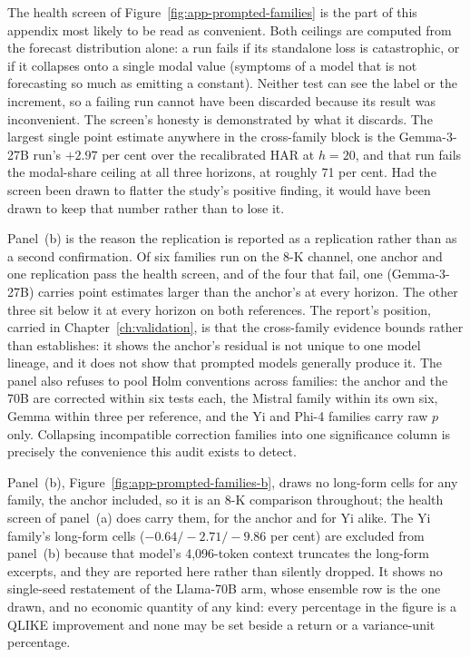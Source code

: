 The health screen of Figure~\ref{fig:app-prompted-families} is the part of this appendix most likely to be read as convenient. Both ceilings are computed from the
forecast distribution alone: a run fails if its standalone loss is
catastrophic, or if it collapses onto a single modal value (symptoms of a
model that is not forecasting so much as emitting a constant). Neither
test can see the label or the increment, so a failing run cannot have been
discarded because its result was inconvenient. The screen's honesty is
demonstrated by what it discards. The largest single point estimate anywhere
in the cross-family block is the Gemma-3-27B run's $+2.97$ per cent over the
recalibrated HAR at $h=20$, and that run fails the modal-share ceiling at all
three horizons, at roughly 71 per cent. %
Had the screen been drawn to flatter the study's positive finding, it would
have been drawn to keep that number rather than to lose it.

Panel~(b) is the reason the replication is reported as a replication rather
than as a second confirmation. Of six families run on the 8-K channel, one
anchor and one replication pass the health screen, and of the four that fail,
one (Gemma-3-27B) carries point estimates larger than the anchor's at
every horizon. The other three sit below it at every horizon on both
references. %
The report's position,
carried in Chapter~\ref{ch:validation}, is that the cross-family evidence
bounds rather than establishes: it shows the anchor's residual is not unique
to one model lineage, and it does not show that prompted models generally
produce it. The panel also refuses to pool Holm conventions across families:
the anchor and the 70B are corrected within six tests each, the Mistral
family within its own six, Gemma within three per reference, and the Yi and
Phi-4 families carry raw $p$ only. Collapsing incompatible
correction families into one significance column is precisely the convenience
this audit exists to detect.

Panel~(b), Figure~\ref{fig:app-prompted-families-b}, draws no long-form cells
for any family, the anchor included, so it is an 8-K comparison throughout;
the health screen of panel~(a) does carry them, for the anchor and for Yi alike. The Yi family's long-form cells
($-0.64/-2.71/-9.86$ per cent) are excluded from panel~(b) because that
model's 4,096-token context truncates the long-form excerpts, and they are
reported here rather than silently dropped. %
It shows no single-seed restatement of the Llama-70B arm, whose ensemble row
is the one drawn, and no economic quantity of any kind: every percentage in
the figure is a QLIKE improvement and none may be set beside a return or a
variance-unit percentage.

